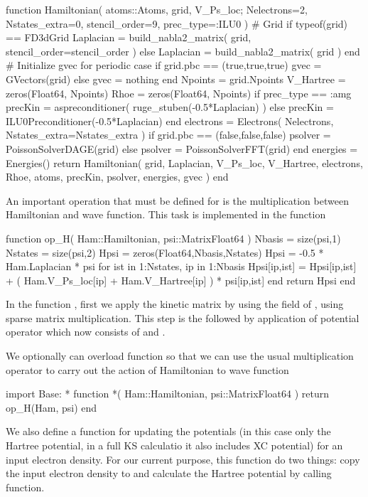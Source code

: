 \begin{juliacode}
function Hamiltonian( atoms::Atoms, grid, V_Ps_loc;
  Nelectrons=2, Nstates_extra=0, stencil_order=9,
  prec_type=:ILU0
)
  # Grid
  if typeof(grid) == FD3dGrid
      Laplacian = build_nabla2_matrix( grid, stencil_order=stencil_order )
  else
      Laplacian = build_nabla2_matrix( grid )
  end
  # Initialize gvec for periodic case
  if grid.pbc == (true,true,true)
      gvec = GVectors(grid)
  else
      gvec = nothing
  end
  Npoints = grid.Npoints
  V_Hartree = zeros(Float64, Npoints)
  Rhoe = zeros(Float64, Npoints)
  if prec_type == :amg
      precKin = aspreconditioner( ruge_stuben(-0.5*Laplacian) )
  else
      precKin = ILU0Preconditioner(-0.5*Laplacian)
  end
  electrons = Electrons( Nelectrons, Nstates_extra=Nstates_extra )
  if grid.pbc == (false,false,false)
      psolver = PoissonSolverDAGE(grid)
  else
      psolver = PoissonSolverFFT(grid)
  end
  energies = Energies()
  return Hamiltonian( grid, Laplacian, V_Ps_loc, V_Hartree, electrons,
                      Rhoe, atoms, precKin, psolver, energies, gvec )
end
\end{juliacode}

An important operation that must be defined for  is the
multiplication between Hamiltonian and wave function.
This task is implemented in the function 
\begin{juliacode}
function op_H( Ham::Hamiltonian, psi::Matrix{Float64} )
  Nbasis = size(psi,1)
  Nstates = size(psi,2)
  Hpsi = zeros(Float64,Nbasis,Nstates)
  Hpsi = -0.5 * Ham.Laplacian * psi
  for ist in 1:Nstates, ip in 1:Nbasis
    Hpsi[ip,ist] = Hpsi[ip,ist] + ( Ham.V_Ps_loc[ip] + Ham.V_Hartree[ip] ) * psi[ip,ist]
  end
  return Hpsi
end
\end{juliacode}
In the function , first we apply the kinetic matrix by using the
 field of , using sparse matrix
multiplication. This step is the followed by application of potential operator
which now consists of  and .

We optionally can overload \jlinline{*} function so that we can use the usual
multiplication operator to carry out the action of Hamiltonian to wave function
\begin{juliacode}
import Base: *
function *( Ham::Hamiltonian, psi::Matrix{Float64} )
  return op_H(Ham, psi)
end
\end{juliacode}

We also define a function for updating the potentials (in this case only the Hartree potential, in
a full KS calculatio it also includes XC potential)
for an input electron density.
For our current purpose, this function do two things:
copy the input electron density to  and calculate the
Hartree potential by calling  function.


